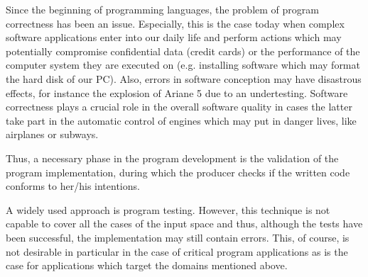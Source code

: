 
Since the beginning of programming languages, the problem of program correctness has been an issue. 
Especially, this is the case today when complex software applications  enter into our daily life and perform actions 
which may potentially compromise confidential data (credit cards) or the performance of the
 computer system they are executed on (e.g. installing software which may format the hard disk of our PC).
Also, errors in software conception may have disastrous effects, for instance
the explosion of Ariane 5 due to an undertesting. Software correctness
 plays a crucial role in the overall software quality  in cases the latter take part in the automatic 
control of engines which may put in danger lives, like airplanes or subways.


Thus, a necessary phase in the program development is the validation of the program implementation, during which 
the producer checks if the written code conforms to her/his intentions. 


A widely used approach is program testing. However, this technique is not capable
to cover all the cases of the input space and thus, although the tests have been successful, 
the implementation may still contain errors. This, of course, is not desirable in particular in the case of critical 
program applications as is the case for applications which target the domains mentioned above.

